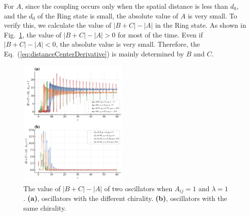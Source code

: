 \documentclass[%
 aip,
 amsmath,amssymb,
 reprint,%
]{revtex4-1}
\begin{document}
For $A$, since the coupling occurs only when the spatial distance is less than $d_0$, and the $d_0$ of the Ring state is small, the absolute value of $A$ is very small. To verify this, we calculate the value of $|B+C|-|A|$ in the Ring state. As shown in Fig.~\ref{fig:2OsBCsubA}, the value of $|B+C|-|A|>0$ for most of the time. Even if $|B+C|-|A|<0$, the absolute value is very small. Therefore, the Eq.~(\ref{eq:distanceCenterDerivative}) is mainly determined by $B$ and $C$.

\begin{figure}[b]
    \includegraphics[width=0.48\textwidth]{./figs/2OsBCsubA.pdf}
    \caption{
        \label{fig:2OsBCsubA} The value of $|B+C|-|A|$ of two oscillators when $A_{ij}=1$ and $\lambda=1$.
        \textbf{(a)}, oscillators with the different chirality.
        \textbf{(b)}, oscillators with the same chirality.
    }
\end{figure}
\end{document}
